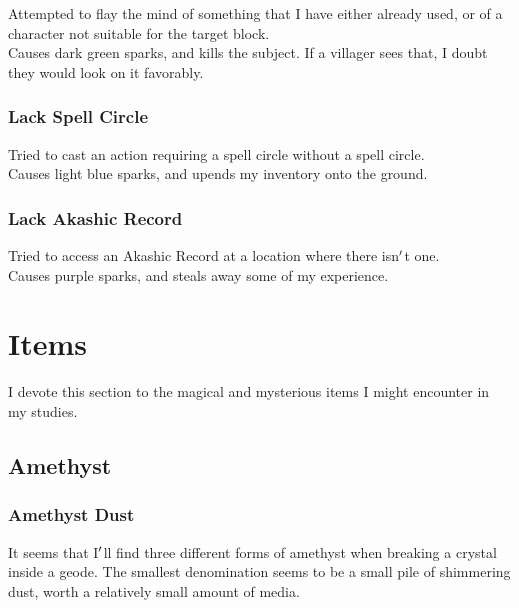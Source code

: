 \documentclass[12pt]{article}
\begin{document}
    Attempted to flay the mind of something that I have either already used, or of a character not suitable for the target block.\\Causes dark green sparks, and kills the subject. If a villager sees that, I doubt they would look on it favorably.\\


  \subsubsection*{Lack Spell Circle}

    Tried to cast an action requiring a spell circle without a spell circle.\\Causes light blue sparks, and upends my inventory onto the ground.\\


  \subsubsection*{Lack Akashic Record}

    Tried to access an Akashic Record at a location where there isn$\rq$t one.\\Causes purple sparks, and steals away some of my experience.\\

\newpage

\label{sec:items}

\section*{Items}
  I devote this section to the magical and mysterious items I might encounter in my studies.\\



\label{sec:items/amethyst}
\subsection*{Amethyst}


  \label{sec: items/amethyst@dust}

  \subsubsection*{ Amethyst Dust }
      It seems that I$\rq$ll find three different forms of amethyst when breaking a crystal inside a geode. The smallest denomination seems to be a small pile of shimmering dust, worth a relatively small amount of media.\\
\end{document}
